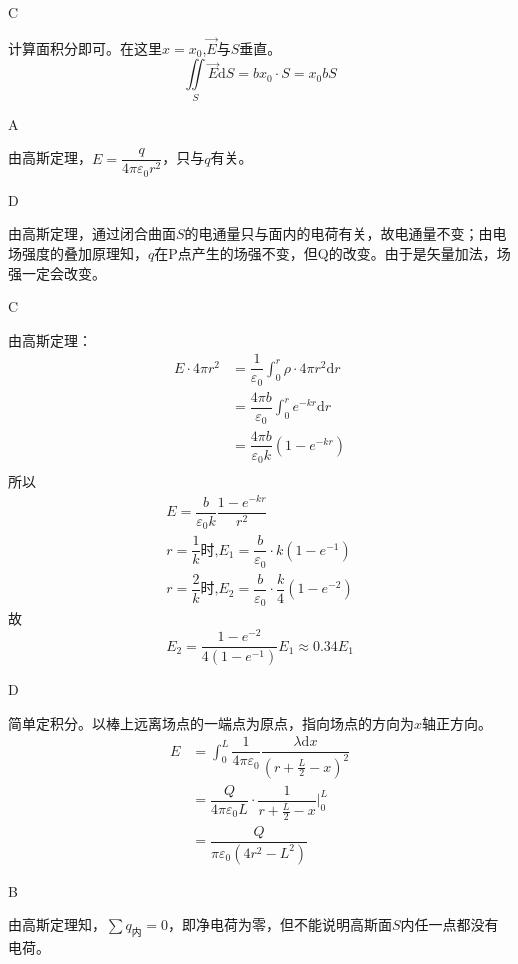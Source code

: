 \documentclass[b5paper,opensource,sourcefont,parskip]{qyxf-book}
\newcommand{\di}[1]{\mathrm{d}#1}
\begin{document}
C

\solve
计算面积分即可。在这里$x=x_0$,$\vec{E}$与$S$垂直。
\begin{equation*}
	 \iint\limits_S \vec{E}\di{S}=bx_0\cdot S=x_0bS
\end{equation*}

A

\solve
由高斯定理，$E=\dfrac{q}{4\pi\varepsilon_0 r^2}$，只与$q$有关。

D

\solve
由高斯定理，通过闭合曲面$S$的电通量只与面内的电荷有关，故电通量不变；由电场强度的叠加原理知，$q$在P点产生的场强不变，但Q的改变。由于是矢量加法，场强一定会改变。

C

\solve
由高斯定理：
\begin{align*}
	E\cdot 4\pi r^2&=\dfrac{1}{\varepsilon_0}\int_0^r\rho\cdot 4\pi r^2\di{r}\\
	&=\dfrac{4\pi b}{\varepsilon_0}\int_0^r e^{-kr}\di{r}\\
	&=\dfrac{4\pi b}{\varepsilon_0 k}(1-e^{-kr})\\
\end{align*}
所以
\begin{gather*}
	E=\dfrac{b}{\varepsilon_0 k}\dfrac{1-e^{-kr}}{r^2}\\
	r=\dfrac{1}{k}\textbf{时,}E_1=\dfrac{b}{\varepsilon_0}\cdot k(1-e^{-1})\\
	r=\dfrac{2}{k}\textbf{时,}E_2=\dfrac{b}{\varepsilon_0}\cdot \dfrac{k}{4}(1-e^{-2})
\end{gather*}
故
\begin{equation*}
	E_2=\dfrac{1-e^{-2}}{4(1-e^{-1})}E_1\approx 0.34E_1
\end{equation*}

D

\solve
简单定积分。以棒上远离场点的一端点为原点，指向场点的方向为$x$轴正方向。
\begin{align*}
	E&=\int_{0}^{L}\dfrac{1}{4\pi \varepsilon_0}\dfrac{\lambda\di{x}}{{(r+\frac{L}{2}-x)}^2}\\
	&=\dfrac{Q}{4\pi \varepsilon_0 L}\cdot \dfrac{1}{{r+\frac{L}{2}-x}}\bigg|_0^L\\
	&=\dfrac{Q}{\pi \varepsilon_0(4r^2-L^2)}
\end{align*}

B

\solve
由高斯定理知，$\sum q_{\text{内}}=0$，即净电荷为零，但不能说明高斯面$S$内任一点都没有电荷。
\end{document}
